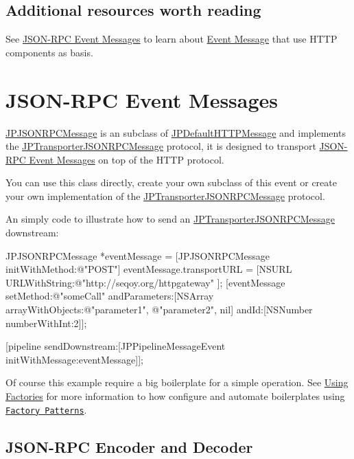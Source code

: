 \subsection*{Additional resources worth reading}

See \hyperlink{a00008}{JSON-\/RPC Event Messages} to learn about \hyperlink{a00006}{Event Message} that use HTTP components as basis.

\par
 \par
  \hypertarget{jsonrpc_messages_page}{}\section{JSON-\/RPC Event Messages}\label{jsonrpc_messages_page}
\hyperlink{a00018}{JPJSONRPCMessage} is an subclass of \hyperlink{a00012}{JPDefaultHTTPMessage} and implements the \hyperlink{a00041}{JPTransporterJSONRPCMessage} protocol, it is designed to transport \hyperlink{a00008}{JSON-\/RPC Event Messages} on top of the HTTP protocol. 

You can use this class directly, create your own subclass of this event or create your own implementation of the \hyperlink{a00041}{JPTransporterJSONRPCMessage} protocol. 

An simply code to illustrate how to send an \hyperlink{a00041}{JPTransporterJSONRPCMessage} downstream: 
\begin{DoxyCode}
 JPJSONRPCMessage *eventMessage = [JPJSONRPCMessage initWithMethod:@"POST"]
 eventMessage.transportURL = [NSURL URLWithString:@"http://seqoy.org/httpgateway"
      ];
 [eventMessage setMethod:@"someCall" 
           andParameters:[NSArray arrayWithObjects:@"parameter1", @"parameter2", 
      nil]
                   andId:[NSNumber numberWithInt:2]];
 
 [pipeline sendDownstream:[JPPipelineMessageEvent initWithMessage:eventMessage]];
      
\end{DoxyCode}
 Of course this example require a big boilerplate for a simple operation. See \hyperlink{a00004}{Using Factories} for more information to how configure and automate boilerplates using \href{http://en.wikipedia.org/wiki/Factory_method_pattern}{\tt Factory Patterns}. \par
 \par
 

\subsection*{JSON-\/RPC Encoder and Decoder}

